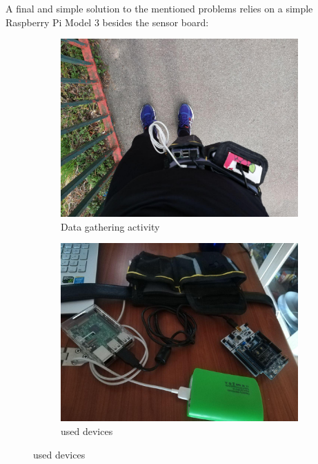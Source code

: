 A final and simple solution to the mentioned problems relies on a simple Raspberry Pi Model 3 besides the sensor board:
\begin{center}
	\begin{figure}[H]
		\begin{subfigure}[H]{0.45\textwidth}
			\includegraphics[scale=0.35]{figures/data_gathering_1.jpg}
			\caption{Data gathering activity}\label{fig:3a}
		\end{subfigure}
		\hfill
		\begin{subfigure}[H]{0.45\textwidth}
			\includegraphics[scale=0.35]{figures/data_gathering_2.jpg}
			\caption{used devices}\label{fig:3b}
		\end{subfigure}
	\end{figure} 
\end{center}
